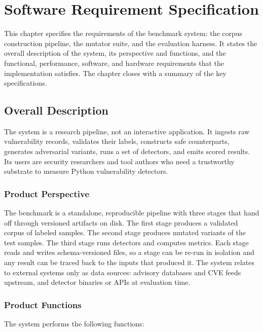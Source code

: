 \chapter{Software Requirement Specification}
\label{ch:srs}

This chapter specifies the requirements of the benchmark system: the corpus
construction pipeline, the mutator suite, and the evaluation harness. It states
the overall description of the system, its perspective and functions, and the
functional, performance, software, and hardware requirements that the
implementation satisfies. The chapter closes with a summary of the key
specifications.


\section{Overall Description}

The system is a research pipeline, not an interactive application. It ingests
raw vulnerability records, validates their labels, constructs safe
counterparts, generates adversarial variants, runs a set of detectors, and
emits scored results. Its users are security researchers and tool authors who
need a trustworthy substrate to measure Python vulnerability detectors.

\subsection{Product Perspective}

The benchmark is a standalone, reproducible pipeline with three stages that hand
off through versioned artifacts on disk. The first stage produces a validated
corpus of labeled samples. The second stage produces mutated variants of the
test samples. The third stage runs detectors and computes metrics. Each stage
reads and writes schema-versioned files, so a stage can be re-run in isolation
and any result can be traced back to the inputs that produced it. The system
relates to external systems only as data sources: advisory databases and CVE
feeds upstream, and detector binaries or APIs at evaluation time.

\subsection{Product Functions}

The system performs the following functions:


